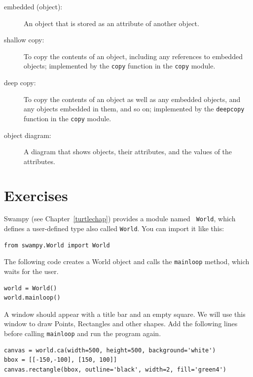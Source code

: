 \documentclass[10pt]{book}
\begin{document}
\begin{CJK}{UTF8}{gbsn}
\begin{description}
\item[embedded (object):] An object that is stored as an attribute
of another object.

\item[shallow copy:] To copy the contents of an object, including
any references to embedded objects;
implemented by the {\tt copy} function in the {\tt copy} module.

\item[deep copy:] To copy the contents of an object as well as any
embedded objects, and any objects embedded in them, and so on;
implemented by the {\tt deepcopy} function in the {\tt copy} module.

\item[object diagram:] A diagram that shows objects, their
attributes, and the values of the attributes.

\end{description}


\section{Exercises}

\begin{exercise}
\label{canvas}

Swampy (see Chapter~\ref{turtlechap}) provides a module named {\tt
  World}, which defines a user-defined type also called {\tt World}.
You can import it like this:

\begin{verbatim}
from swampy.World import World
\end{verbatim}

The following code creates a World object and calls
the {\tt mainloop} method, which
waits for the user.

\begin{verbatim}
world = World()
world.mainloop()
\end{verbatim}

A window should appear with a title bar and an empty square.
We will use this window to draw Points,
Rectangles and other shapes.  
Add the following lines before calling
\verb"mainloop" and run the program again.

\begin{verbatim}
canvas = world.ca(width=500, height=500, background='white')
bbox = [[-150,-100], [150, 100]]
canvas.rectangle(bbox, outline='black', width=2, fill='green4')
\end{verbatim}


\end{exercise}
\end{CJK}
\end{document}
